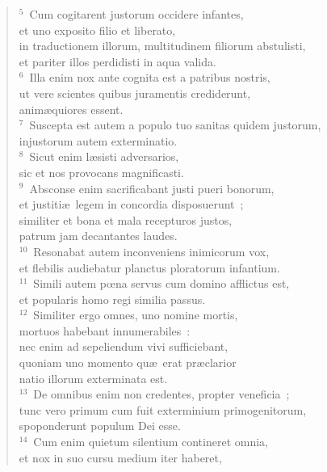 \begin{flushleft}\begin{verse}${}^{5}$~Cum cogitarent justorum occidere infantes,\\ et uno exposito filio et liberato,\\ in traductionem illorum, multitudinem filiorum abstulisti,\\ et pariter illos perdidisti in aqua valida.\\
${}^{6}$~Illa enim nox ante cognita est a patribus nostris,\\ ut vere scientes quibus juramentis crediderunt,\\ anim\ae quiores essent.\\
${}^{7}$~Suscepta est autem a populo tuo sanitas quidem justorum,\\ injustorum autem exterminatio.\\
${}^{8}$~Sicut enim l\ae sisti adversarios,\\ sic et nos provocans magnificasti.\\
${}^{9}$~Absconse enim sacrificabant justi pueri bonorum,\\ et justiti\ae\ legem in concordia disposuerunt~;\\ similiter et bona et mala recepturos justos,\\ patrum jam decantantes laudes.\\
${}^{10}$~Resonabat autem inconveniens inimicorum vox,\\ et flebilis audiebatur planctus ploratorum infantium.\\
${}^{11}$~Simili autem pœna servus cum domino afflictus est,\\ et popularis homo regi similia passus.\\
${}^{12}$~Similiter ergo omnes, uno nomine mortis,\\ mortuos habebant innumerabiles~:\\ nec enim ad sepeliendum vivi sufficiebant,\\ quoniam uno momento qu\ae\ erat pr\ae clarior\\ natio illorum exterminata est.\\
${}^{13}$~De omnibus enim non credentes, propter veneficia~;\\ tunc vero primum cum fuit exterminium primogenitorum,\\ spoponderunt populum Dei esse.\\
${}^{14}$~Cum enim quietum silentium contineret omnia,\\ et nox in suo cursu medium iter haberet,\\

\end{verse}
\end{flushleft}
